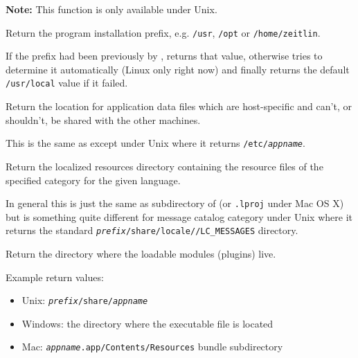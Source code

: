 \textbf{Note: } This function is only available under Unix.

Return the program installation prefix, e.g. \texttt{/usr}, \texttt{/opt} or 
\texttt{/home/zeitlin}.

If the prefix had been previously by 
, returns that
value, otherwise tries to determine it automatically (Linux only right
now) and finally returns the default \texttt{/usr/local} value if it failed.


\label{wxstandardpathsgetlocaldatadir}


Return the location for application data files which are host-specific and
can't, or shouldn't, be shared with the other machines.

This is the same as  except
under Unix where it returns \texttt{/etc/\textit{appname}}.


\label{wxstandardpathsgetlocalizedresourcesdir}


Return the localized resources directory containing the resource files of the
specified category for the given language.

In general this is just the same as  subdirectory of 
 (or 
\texttt{.lproj} under Mac OS X) but is something quite
different for message catalog category under Unix where it returns the standard 
\texttt{\textit{prefix}/share/locale//LC\_MESSAGES} directory.


\label{wxstandardpathsgetpluginsdir}


Return the directory where the loadable modules (plugins) live.

Example return values:
\begin{itemize}
    \item Unix: \texttt{\textit{prefix}/share/\textit{appname}}
    \item Windows: the directory where the executable file is located
    \item Mac: \texttt{\textit{appname}.app/Contents/Resources} bundle subdirectory
\end{itemize}

